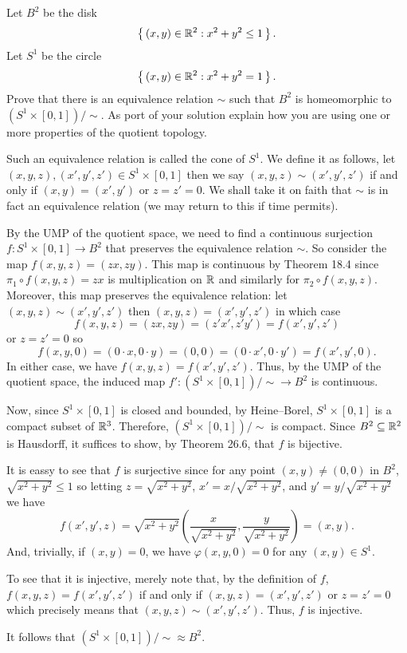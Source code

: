 \begin{problem}
Let $B^2$ be the disk
\[
\left\{\,(x,y)\in\mathbb{R}^2:x^2+y^2\leq 1\,\right\}.
\]
Let $S^1$ be the circle
\[
\left\{\,(x,y)\in\mathbb{R}^2:x^2+y^2=1\,\right\}.
\]
Prove that there is an equivalence relation $\sim$ such that $B^2$ is
homeomorphic to $(S^1\times[0,1])/{\sim}$. As port of your solution explain
how you are using one or more properties of the quotient topology.
\end{problem}
\begin{solution}
Such an equivalence relation is called the cone of $S^1$. We define it as
follows, let $(x,y,z),(x',y',z')\in S^1\times[0,1]$ then we say
$(x,y,z)\sim(x',y',z')$ if and only if $(x,y)=(x',y')$ or $z=z'=0$. We
shall take it on faith that $\sim$ is in fact an equivalence relation (we
may return to this if time permits).

By the UMP of the quotient space, we need to find a continuous surjection
$f\colon S^1\times[0,1]\to B^2$ that preserves the equivalence relation
$\sim$. So consider the map $f(x,y,z)=(zx,zy)$. This map is
continuous by Theorem 18.4 since $\pi_1\circ f(x,y,z)=zx$ is multiplication
on $\mathbb{R}$ and similarly for $\pi_2\circ f(x,y,z)$. Moreover, this map
preserves the equivalence relation: let $(x,y,z)\sim(x',y',z')$ then
$(x,y,z)=(x',y',z')$ in which case
\[
f(x,y,z)=(zx,zy)=(z'x',z'y')=f(x',y',z')
\]
or $z=z'=0$ so
\[
f(x,y,0)=(0\cdot x,0\cdot y)=(0,0)=(0\cdot x',0\cdot y')=f(x',y',0).
\]
In either case, we have $f(x,y,z)=f(x',y',z')$. Thus, by the UMP of the
quotient space, the induced map $f'\colon (S^1\times[0,1])/{\sim}\to B^2$
is continuous.

Now, since $S^1\times[0,1]$ is closed and bounded, by Heine--Borel,
$S^1\times[0,1]$ is a compact subset of $\mathbb{R}^3$. Therefore,
$(S^1\times[0,1])/{\sim}$ is compact. Since $B^2\subseteq\mathbb{R}^2$ is
Hausdorff, it suffices to show, by Theorem 26.6, that $f$ is bijective.

It is eassy to see that $f$ is surjective since for any point
$(x,y)\neq(0,0)$ in $B^2$, $\sqrt{x^2+y^2}\leq 1$ so letting
$z=\sqrt{x^2+y^2}$, $x'=x/\sqrt{x^2+y^2}$, and $y'=y/\sqrt{x^2+y^2}$ we
have
\[
f(x',y',z)=\sqrt{x^2+y^2}
\left(\frac{x}{\sqrt{x^2+y^2}},
\frac{y}{\sqrt{x^2+y^2}}\right)=(x,y).
\]
And, trivially, if $(x,y)=0$, we have $\varphi(x,y,0)=0$ for any $(x,y)\in
S^1$.

To see that it is injective, merely note that, by the definition of $f$,
$f(x,y,z)=f(x',y',z')$ if and only if $(x,y,z)=(x',y',z')$ or $z=z'=0$
which precisely means that $(x,y,z)\sim(x',y',z')$. Thus, $f$ is
injective.

It follows that $(S^1\times[0,1])/{\sim}\approx B^2$.
\end{solution}

